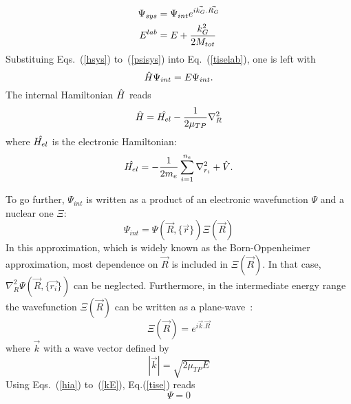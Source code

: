 \documentclass[a4paper, 10 pt]{report}
\begin{document}
\begin{align}
\Psi_{sys} &= \Psi_{int}e^{i\vec{k_G}.\vec{R_G}} \\
E^{lab} &= E + {k_G^2 \over 2M_{tot}}
\label{psisys}
\end{align}
Substituing Eqs.~(\ref{hsys}) to~(\ref{psisys}) into Eq.~(\ref{tiselab}), one is left with
\begin{equation}
\Hat{H} \Psi_{int} = E \Psi_{int}.
\label{tise}
\end{equation}
The internal Hamiltonian $\Hat{H}$ reads
\begin{equation}
\Hat{H} = \Hat{H_{el}}-{1\over 2\mu_{TP}}\nabla^2_{R}
\label{hia}
\end{equation}
where  $\Hat{H_{el}}$ is the electronic Hamiltonian:
\begin{equation}
\Hat{H_{el}} = -{1\over 2m_{e}} \sum_{i=1}^{n_e} \nabla^2_{r_i} + \Hat{V}.
\end{equation}

To go further, $\Psi_{int}$ is written as a product of an electronic wavefunction $\Psi$ and a nuclear one $\Xi$:
\begin{equation}
\Psi_{int} = \Psi(\vec{R},\{\vec{r}\})\Xi(\vec{R})
\label{psiint}
\end{equation}
In this approximation, which is widely known as the Born-Oppenheimer approximation, most dependence on $\vec{R}$ is included in $\Xi(\vec{R})$. In that case, $\nabla_R^2 \Psi(\vec{R},\{\vec{r_i}\})$ can be neglected. Furthermore, in the intermediate energy range the wavefunction $\Xi(\vec{R})$ can be written as a plane-wave~\cite{bransden1992charge}:
\begin{equation}
\Xi(\vec{R}) =  e^{i\vec{k}.\vec{R}}
\label{gamma}
\end{equation}
where $\vec{k}$ with a wave vector defined by
\begin{equation}
|\vec{k}| = \sqrt{2\mu_{TP}E} 
\label{kE}
\end{equation}
Using Eqs.~(\ref{hia}) to~(\ref{kE}), Eq.(\ref{tise}) reads
\begin{equation}
[\Hat{H}_{el} - {i\over\mu_{TP}} \vec{k}.\vec{\nabla_R}]\Psi = 0
\label{eqint}
\end{equation}
\end{document}
